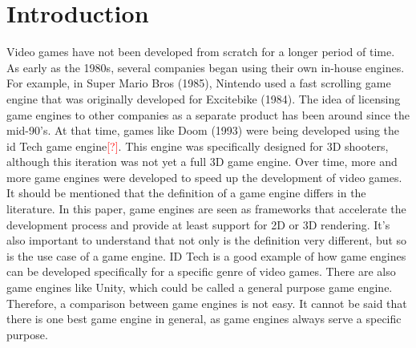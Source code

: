 \section{Introduction}
Video games have not been developed from scratch for a longer period of time.
As early as the 1980s, several companies began using their own in-house engines.
For example, in Super Mario Bros (1985), Nintendo used a fast scrolling game engine that was originally developed for Excitebike (1984)\cite{history-digital-games}.
The idea of licensing game engines to other companies as a separate product has been around since the mid-90's.
At that time, games like Doom (1993) were being developed using the id Tech game engine\textcolor{red}{[?]}.
This engine was specifically designed for 3D shooters, although this iteration was not yet a full 3D game engine.
Over time, more and more game engines were developed to speed up the development of video games.
It should be mentioned that the definition of a game engine differs in the literature.
In this paper, game engines are seen as frameworks that accelerate the development process and provide at least support for 2D or 3D rendering.
It's also important to understand that not only is the definition very different, but so is the use case of a game engine.
ID Tech is a good example of how game engines can be developed specifically for a specific genre of video games.
There are also game engines like Unity, which could be called a general purpose game engine.
Therefore, a comparison between game engines is not easy.
It cannot be said that there is one best game engine in general, as game engines always serve a specific purpose.
